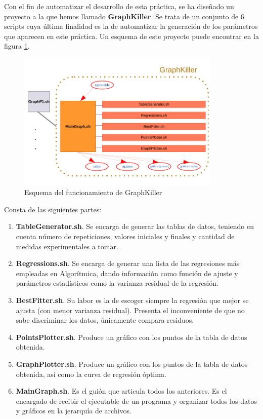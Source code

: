 \documentclass{homework}
\begin{document}
    Con el fin de automatizar el desarrollo de esta práctica, se ha diseñado un proyecto a la que hemos llamado 
    \textbf{GraphKiller}. Se trata de un conjunto de 6 scripts cuya última finalidad es la de automatizar la generación
    de los parámetros que aparecen en este práctica. Un esquema de este proyecto puede encontrar en la 
    figura \ref{graph-killer}. 

    \begin{figure}[H]
        \centering
        \includegraphics[width=0.87\textwidth]{img/esquema_graphkiller.pdf}
        \caption{Esquema del funcionamiento de GraphKiller}
        \label{graph-killer}
    \end{figure}

    Consta de las siguientes partes:

    \begin{enumerate}
        \item \textbf{TableGenerator.sh}. Se encarga de generar las tablas de datos, teniendo en cuenta número de repeticiones, valores iniciales y finales y cantidad de medidas experimentales a tomar.
        \item \textbf{Regressions.sh}. Se encarga de generar una lista de las regresiones más empleadas en Algorítmica, dando información como función de ajuste y parámetros estadísticos como la varianza residual de la regresión.
        \item \textbf{BestFitter.sh}. Su labor es la de escoger siempre la regresión que mejor se ajusta (con menor varianza residual). Presenta el inconveniente de que no sabe discriminar los datos, únicamente compara residuos.
        \item \textbf{PointsPlotter.sh}. Produce un gráfico con los puntos de la tabla de datos obtenida.
        \item \textbf{GraphPlotter.sh}. Produce un gráfico con los puntos de la tabla de datos obtenida, así como la curva de regresión óptima. 
        \item \textbf{MainGraph.sh}. Es el guión que articula todos los anteriores. Es el encargado de recibir el ejecutable de un programa y organizar todos los datos y gráficos en la jerarquía de archivos. 
    \end{enumerate}
\end{document}
